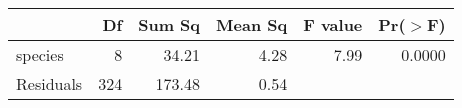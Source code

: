 \begin{table}[ht]
\centering
\begin{tabular}{lrrrrr}
  \hline
 & Df & Sum Sq & Mean Sq & F value & Pr($>$F) \\ 
  \hline
species & 8 & 34.21 & 4.28 & 7.99 & 0.0000 \\ 
  Residuals & 324 & 173.48 & 0.54 &  &  \\ 
   \hline
\end{tabular}
\end{table}
